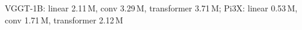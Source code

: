 VGGT-1B: linear 2.11\,M, conv 3.29\,M, transformer 3.71\,M; Pi3X: linear 0.53\,M, conv 1.71\,M, transformer 2.12\,M
